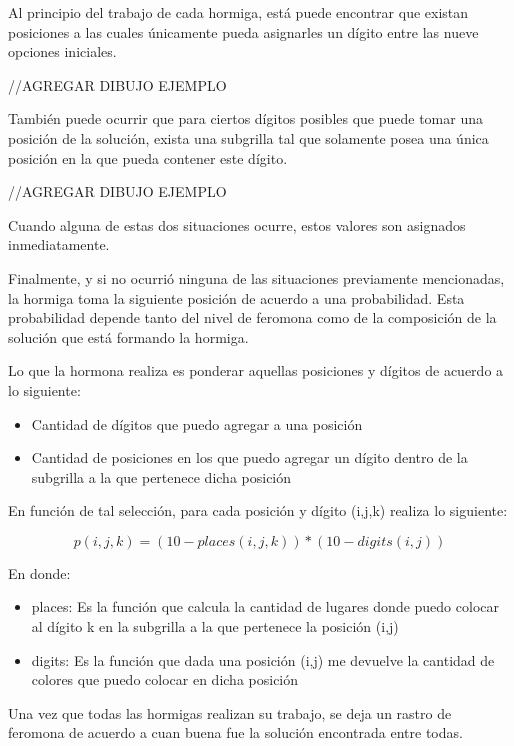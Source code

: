 \documentclass[a4paper,spanish]{article}
\begin{document}
Al principio del trabajo de cada hormiga, está puede encontrar que existan posiciones a las cuales únicamente pueda asignarles 
un dígito entre las nueve opciones iniciales.

//AGREGAR DIBUJO EJEMPLO

También puede ocurrir que para ciertos dígitos posibles que puede tomar una posición de la solución, exista una subgrilla tal que 
solamente posea una única posición en la que pueda contener este dígito.

//AGREGAR DIBUJO EJEMPLO

Cuando alguna de estas dos situaciones ocurre, estos valores son asignados inmediatamente.

Finalmente, y si no ocurrió ninguna de las situaciones previamente mencionadas, la hormiga toma la siguiente posición de acuerdo 
a una probabilidad. Esta probabilidad depende tanto del nivel de feromona como de la composición de la solución que está formando la hormiga.

Lo que la hormona realiza es ponderar aquellas posiciones y dígitos de acuerdo a lo siguiente:

\begin{itemize}
	\item Cantidad de dígitos que puedo agregar a una posición
	\item Cantidad de posiciones en los que puedo agregar un dígito dentro de la subgrilla a la que pertenece dicha posición
\end{itemize}

En función de tal selección, para cada posición y dígito (i,j,k) realiza lo siguiente:

\begin{equation}
	p(i,j,k)=(10-places(i,j,k))*(10-digits(i,j))
\end{equation}

En donde:

\begin{itemize}
	\item places: Es la función que calcula la cantidad de lugares donde puedo colocar al dígito k en la subgrilla a la que pertenece la posición (i,j)
	\item digits: Es la función que dada una posición (i,j) me devuelve la cantidad de colores que puedo colocar en dicha posición
\end{itemize}


Una vez que todas las hormigas realizan su trabajo, se deja un rastro de feromona de acuerdo a cuan buena fue la solución encontrada entre todas.
\end{document}
